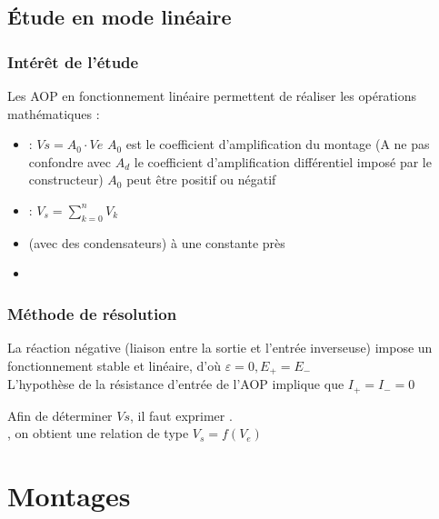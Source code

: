 

\chapter{Étude en mode linéaire}
\section{Intérêt de l’étude }

Les AOP en fonctionnement linéaire permettent de réaliser les opérations mathématiques :

\begin{itemize}
  \item {} : $Vs=A_0 \cdot Ve$
  $A_0$ est le coefficient d’amplification du montage (A ne pas confondre avec $A_d$ le coefficient d’amplification différentiel imposé par le constructeur)
  $A_0$ peut être positif ou négatif
  \item {} : $V_s=\sum_{k=0}^{n} V_k$
  \item {} (avec des condensateurs) à une constante près
  \item {}
\end{itemize}

\section{Méthode de résolution}
La {\color{red}réaction négative} (liaison entre la sortie et l’entrée inverseuse) impose un fonctionnement stable et linéaire, d'où {\color{red}$\varepsilon=0, E_+=E_-$} \\

L’hypothèse de la résistance d’entrée de l’AOP implique que $I_+=I_-=0$

Afin de déterminer $Vs$, il faut exprimer . \\

, on obtient une relation de type $V_s = f(V_e)$




 \part{Montages}
